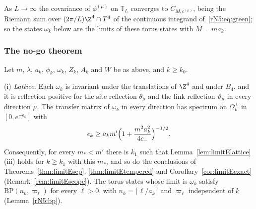As $L\to\infty$ the covariance of $\phi^{(\mu)}$ on $\mathbb T_L$ converges
to $C_{M,c^{(\mu)}}$, being the Riemann sum over $(2\pi/L)\Z^4\cap T^4$ of
the continuous integrand of~\eqref{rN5:eq:green}; so the states $\omega_k$
below are the limits of these torus states with $M=ma_k$.

\subsubsection{The no-go theorem}

\begin{theorem}\label{rN5:nogo}
Let $m$, $\lambda$, $a_k$, $\phi_k$, $\omega_k$, $Z_k$, $A_k$ and $W$ be as
above, and $k\ge k_0$.

\textup{(i)} \emph{Lattice.} Each $\omega_k$ is invariant under the
translations of $\Z^4$ and under $B_4$, and it is reflection positive for
the site reflection $\theta_\mu$ and the link reflection $\vartheta_\mu$ in
every direction $\mu$. The transfer matrix of $\omega_k$ in every direction
has spectrum on $\Omega_k^\perp$ in $[0,e^{-\epsilon_k}]$ with
\[
\epsilon_k\ge a_km'\Bigl(1+\frac{m^2a_k^2}{4c_-}\Bigr)^{-1/2} .
\]
Consequently, for every $m_*<m'$ there is $k_1$ such that
Lemma~\textup{\ref{lem:limitElattice}(iii)} holds for $k\ge k_1$ with this
$m_*$, and so do the conclusions of Theorems~\textup{\ref{thm:limitEsep}},
\textup{\ref{thm:limitEtempered}} and Corollary~\textup{\ref{cor:limitEexact}}
\textup{(}Remark~\textup{\ref{rem:limitEscope}}\textup{)}. The torus states
whose limit is $\omega_k$ satisfy $\mathrm{BP}(n_k,\varpi_\ell)$ for every
$\ell>0$, with $n_k=\lceil\ell/a_k\rceil$ and $\varpi_\ell$ independent of
$k$ \textup{(}Lemma~\textup{\ref{rN5:bp}}\textup{)}.


\end{theorem}
